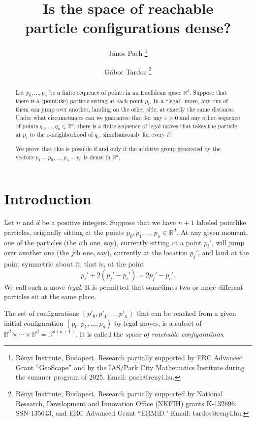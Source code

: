 \documentclass{article}
\title{Is the space of reachable\\ particle configurations dense?}
\author{J\'anos Pach \thanks{R\'enyi Institute, Budapest. Research partially supported by ERC Advanced Grant ``GeoScape'' and by the IAS/Park City Mathematics Institute during the summer program of 2025.  Email: pach@renyi.hu.} \and G\'abor Tardos \thanks{R\'enyi Institute, Budapest. Research partially supported by National Research, Development and Innovation Office (NKFIH) grants K-132696, SSN-135643, and ERC Advanced Grant ``ERMiD.'' Email: tardos@renyi.hu. }}
\date{}
\theoremstyle{definition}
\newcommand{\R}{\mathbb R}
\begin{document}
\maketitle
\begin{abstract}
Let $p_0,\ldots,p_n$ be a finite sequence of points in an Euclidean space $\R^d$. Suppose that there is a (pointlike) particle sitting at each point $p_i$. In a ``legal'' move, any one of them can jump over another, landing on the other side, at exactly the same distance. Under what circumstances can we guarantee that for any $\varepsilon>0$ and any other sequence of points $q_0,\ldots, q_n\in\R^d$, there is a finite sequence of legal moves that takes the particle at $p_i$ to the $\varepsilon$-neighborhood of $q_i$, simultaneously for every $i$?

We prove that this is possible if and only if the additive group generated by the vectors $p_1-p_0,\ldots,p_n-p_0$ is dense in $\R^d$.
\end{abstract}

\section{Introduction}


Let $n$ and $d$ be a positive integers. Suppose that we have $n+1$ labeled pointlike particles, originally sitting at the points $p_0, p_1, \ldots, p_n\in\R^d$.
At any given moment, one of the particles (the $i$th one, say), currently sitting at a point $p_i'$, will jump over another one (the $j$th one, say), currently at the location $p_j'$, and land at the point symmetric about it, that is, at the point
$$p_i'+2(p_j'-p_i')=2p_j'-p_i'.$$
We call such a move \emph{legal}. It is permitted that sometimes two or more different particles sit at the same place.

The set of configurations $(p'_0, p'_1, \ldots, p'_n)$ that can be reached from a given initial configuration $(p_0, p_1, \ldots, p_n)$ by legal moves, is a subset of $\R^d\times\cdots\times\R^d=\R^{d(n+1)}$. It is called the \emph{space of reachable configurations}.
\smallskip
\end{document}
